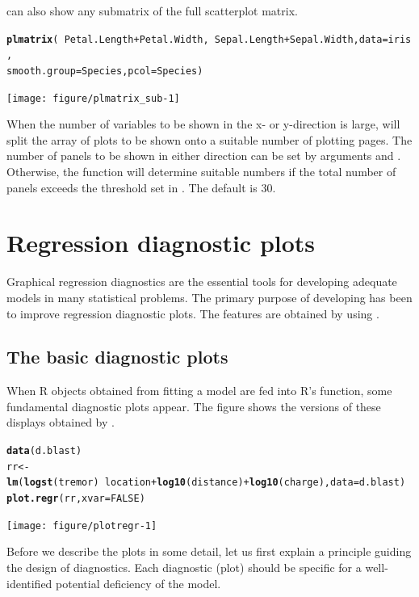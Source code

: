 \documentclass[11pt]{article}\usepackage[]{graphicx}\usepackage[]{color}
\makeatletter
\newcommand{\hlnum}[1]{\textcolor[rgb]{0.686,0.059,0.569}{#1}}%
\newcommand{\hlopt}[1]{\textcolor[rgb]{0,0,0}{#1}}%
\newcommand{\hlstd}[1]{\textcolor[rgb]{0.345,0.345,0.345}{#1}}%
\newcommand{\hlkwb}[1]{\textcolor[rgb]{0.69,0.353,0.396}{#1}}%
\newcommand{\hlkwc}[1]{\textcolor[rgb]{0.333,0.667,0.333}{#1}}%
\newcommand{\hlkwd}[1]{\textcolor[rgb]{0.737,0.353,0.396}{\textbf{#1}}}%
\newenvironment{kframe}{%
 \def\at@end@of@kframe{}%
 \ifinner\ifhmode%
  \def\at@end@of@kframe{\end{minipage}}%
  \begin{minipage}{\columnwidth}%
 \fi\fi%
 \def\FrameCommand##1{\hskip\@totalleftmargin \hskip-\fboxsep
 \colorbox{shadecolor}{##1}\hskip-\fboxsep
     \hskip-\linewidth \hskip-\@totalleftmargin \hskip\columnwidth}%
 \MakeFramed {\advance\hsize-\width
   \@totalleftmargin\z@ \linewidth\hsize
   \@setminipage}}%
 {\par\unskip\endMakeFramed%
 \at@end@of@kframe}
\newenvironment{knitrout}{}{} %
\makeatother
\begin{document}
 can also show any submatrix of the full scatterplot matrix.
\begin{knitrout}
\color{fgcolor}\begin{kframe}
\begin{alltt}
\hlkwd{plmatrix}\hlstd{(}\hlopt{~}\hlstd{Petal.Length}\hlopt{+}\hlstd{Petal.Width,} \hlopt{~}\hlstd{Sepal.Length}\hlopt{+}\hlstd{Sepal.Width,} \hlkwc{data}\hlstd{=iris,}
         \hlkwc{smooth.group}\hlstd{=Species,} \hlkwc{pcol}\hlstd{=Species)}
\end{alltt}
\end{kframe}
\texttt{[image: figure/plmatrix\_sub-1]} 

\end{knitrout}

When the number of variables to be shown in the x- or y-direction is large,
 will split the array of plots to be shown onto a suitable
number of plotting pages. The number of panels to be shown in either
direction can be set by arguments  and . Otherwise, the
function will determine suitable numbers if the total number of panels
exceeds the threshold set in . The default is 30.


\section{Regression diagnostic plots}
Graphical regression diagnostics are the essential tools for developing
adequate models in many statistical problems.
The primary purpose of developing  has been to improve
regression diagnostic plots.
The features are obtained by using .

\subsection{The basic diagnostic plots}
When R objects obtained from fitting a model are fed into R's 
function, some fundamental diagnostic plots appear. 
The figure shows the versions of these displays obtained by .

\begin{knitrout}
\color{fgcolor}\begin{kframe}
\begin{alltt}
\hlkwd{data}\hlstd{(d.blast)}
\hlstd{rr} \hlkwb{<-}
  \hlkwd{lm}\hlstd{(}\hlkwd{logst}\hlstd{(tremor)}\hlopt{~}\hlstd{location}\hlopt{+}\hlkwd{log10}\hlstd{(distance)}\hlopt{+}\hlkwd{log10}\hlstd{(charge),} \hlkwc{data}\hlstd{=d.blast)}
\hlkwd{plot.regr}\hlstd{(rr,} \hlkwc{xvar}\hlstd{=}\hlnum{FALSE}\hlstd{)}
\end{alltt}
\end{kframe}
\texttt{[image: figure/plotregr-1]} 

\end{knitrout}
Before we describe the plots in some detail, let us first explain a 
principle guiding the design of diagnostics.
Each diagnostic (plot) should be specific for a well-identified potential 
deficiency of the model.
\end{document}
